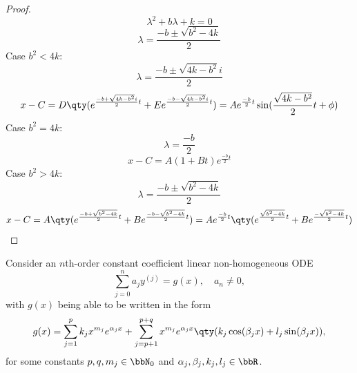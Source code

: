 \documentclass[a4paper,12pt]{report}
\begin{document}
\begin{proof}
\[\lambda^2+b\lambda+k=0\]
\[\lambda=\frac{-b\pm\sqrt{b^2-4k}}{2}\]
Case $b^2<4k$:
\[\lambda=\frac{-b\pm\sqrt{4k-b^2}i}{2}\]
\[x-C=D\qty(e^{\frac{-b+\sqrt{4k-b^2}i}{2}t}+Ee^{\frac{-b-\sqrt{4k-b^2}i}{2}t})=Ae^{\frac{-b}{2}t}\sin(\frac{\sqrt{4k-b^2}}{2}t+\phi)\]
Case $b^2=4k$:
\[\lambda=\frac{-b}{2}\]
\[x-C=A(1+Bt)e^{\frac{-b}{2}t}\]
Case $b^2>4k$:
\[\lambda=\frac{-b\pm\sqrt{b^2-4k}}{2}\]
\[x-C=A\qty(e^{\frac{-b+\sqrt{b^2-4k}}{2}t}+Be^{\frac{-b-\sqrt{b^2-4k}}{2}t})=Ae^{\frac{-b}{2}t}\qty(e^{\frac{\sqrt{b^2-4k}}{2}t}+Be^{\frac{-\sqrt{b^2-4k}}{2}t})\]
\end{proof}
Consider an $n$th-order constant coefficient linear non-homogeneous ODE
\[\sum_{j=0}^na_jy^{(j)}=g(x),\quad a_n\neq 0,\]
with $g(x)$ being able to be written in the form
\[g(x)=\sum_{j=1}^pk_jx^{m_j}e^{\alpha_jx}+\sum_{j=p+1}^{p+q}x^{m_j}e^{\alpha_jx}\qty(k_j\cos(\beta_jx)+l_j\sin(\beta_jx)),\]
for some constants $p,q,m_j\in\bbN_0$ and $\alpha_j,\beta_j,k_j,l_j\in\bbR$.
\end{document}
